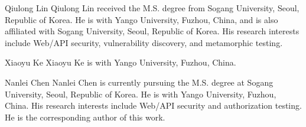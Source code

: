 \documentclass{ieeeaccess}
\theoremstyle{definition}
\begin{document}



\begin{IEEEbiographynophoto}{Qiulong Lin}
Qiulong Lin received the M.S. degree from Sogang University, Seoul, Republic of Korea. He is with Yango University, Fuzhou, China, and is also affiliated with Sogang University, Seoul, Republic of Korea. His research interests include Web/API security, vulnerability discovery, and metamorphic testing.
\end{IEEEbiographynophoto}

\begin{IEEEbiographynophoto}{Xiaoyu Ke}
Xiaoyu Ke is with Yango University, Fuzhou, China.
\end{IEEEbiographynophoto}

\begin{IEEEbiographynophoto}{Nanlei Chen}
Nanlei Chen is currently pursuing the M.S. degree at Sogang University, Seoul, Republic of Korea. He is with Yango University, Fuzhou, China. His research interests include Web/API security and authorization testing. He is the corresponding author of this work.
\end{IEEEbiographynophoto}

\EOD
\end{document}
